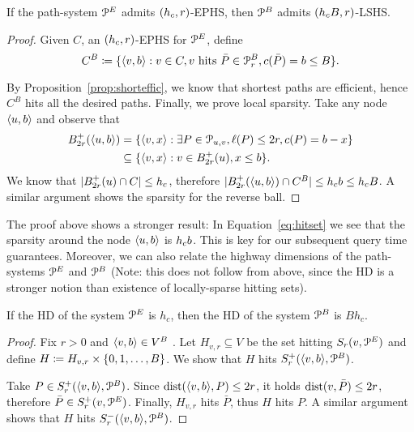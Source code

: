 \begin{proposition}
If the path-system $\mathcal{P}^E$ admits $(h_c,r)$-EPHS, then $\mathcal{P}^B$ admits $(h_c B,r)$-LSHS.
\end{proposition}
\begin{proof}
Given $C$, an $(h_c,r)$-EPHS for $\mathcal{P}^E$, define
\begin{equation}\label{eq:hitset}
C^B\coloneqq \{\langle v,b\rangle: v\in C, v \text{ hits }\bar P\in\mathcal{P}_r^B, c(\bar P)=b\leq B \}.
\end{equation}

By Proposition~\ref{prop:shorteffic}, we know that shortest paths are efficient, hence $C^B$ hits all the desired paths.
Finally, we prove local sparsity.
Take any node $\langle u,b\rangle$ and observe that
\begin{align*}
B^+_{2r}(\langle u,b\rangle) &= \{\langle v,x\rangle: \exists P\in\mathcal{P}_{u,v}, \ell(P)\leq 2r, c(P)=b-x\} \\
&\subseteq \{\langle v,x\rangle: v\in B^+_{2r}(u), x\leq b\} .
\end{align*}
We know that $\lvert B^+_{2r}(u)\cap C\rvert\leq h_c$, therefore $\lvert B^+_{2r}(\langle u,b\rangle)\cap C^B\rvert\leq h_c b\leq h_c B$.
A similar argument shows the sparsity for the reverse ball.
\end{proof}

The proof above shows a stronger result:
In Equation~\eqref{eq:hitset} we see that the sparsity around the node $\langle u,b\rangle$ is $h_c b$.
This is key for our subsequent query time guarantees.
Moreover, we can also relate the highway dimensions of the path-systems $\mathcal{P}^E$ and $\mathcal{P}^B$ (Note: this does not follow from above, since the HD is a stronger notion than existence of locally-sparse hitting sets).
\begin{proposition}\label{prop:HDaugmented}
If the HD of the system $\mathcal{P}^E$ is $h_c$, then the HD of the system $\mathcal{P}^B$ is $Bh_c$.
\end{proposition}
\begin{proof}
Fix $r>0$ and $\langle v,b\rangle\in V^B$ .
Let $H_{v,r}\subseteq V$ be the set hitting $S_r(v,\mathcal{P}^E)$ and define $H\coloneqq H_{v,r}\times\{0,1,\ldots,B\}$.
We show that $H$ hits $S^+_r(\langle v,b\rangle,\mathcal{P}^B)$.

Take $P\in S^+_r(\langle v,b\rangle,\mathcal{P}^B)$.
Since $\text{dist}(\langle v,b\rangle,P)\leq 2r$, it holds $\text{dist}(v,\bar P)\leq 2r$, therefore $\bar P\in S^+_r(v,\mathcal{P}^E)$.
Finally, $H_{v,r}$ hits $\bar P$, thus $H$ hits $P$.
A similar argument shows that $H$ hits $S^-_r(\langle v,b\rangle,\mathcal{P}^B)$.
\end{proof}

